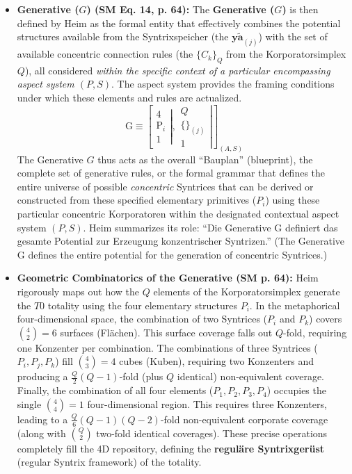 \documentclass[12pt]{article}
\newcommand{\q}[1]{\enquote{#1}}
\newcommand{\aspektivsystem}{P}
\newcommand{\subjektiveraspekt}{S}
\newcommand{\elementarstruktur}{\bm{y\widetilde{a}}_{(j)}}
\newcommand{\generative}{G}
\begin{document}
\begin{itemize}
    \item \textbf{Generative (\( \generative \)) (SM Eq. 14, p. 64):}
    The \textbf{Generative (\( \generative \))} is then defined by Heim as the formal entity that effectively combines the potential structures available from the Syntrixspeicher (the \( \elementarstruktur \)) with the set of available concentric connection rules (the \( \{C_k\}_Q \) from the Korporatorsimplex \( Q \)), all considered \textit{within the specific context of a particular encompassing aspect system \((\aspektivsystem,\subjektiveraspekt)\)}. The aspect system provides the framing conditions under which these elements and rules are actualized.
    \begin{equation}
\mathrm{G} \equiv \left[ \left. \begin{matrix} 4 \\ \mathrm{P}_i \\ 1 \end{matrix} \right| , \left. \begin{matrix} Q \\ \{ \}_{(j)} \\ 1 \end{matrix} \right| \right]_{(A, S)}
\label{eq:original_generative}
\end{equation}
    The Generative \( \generative \) thus acts as the overall \q{Bauplan} (blueprint), the complete set of generative rules, or the formal grammar that defines the entire universe of possible \textit{concentric} Syntrices that can be derived or constructed from these specified elementary primitives (\( P_i \)) using these particular concentric Korporatoren within the designated contextual aspect system \((\aspektivsystem,\subjektiveraspekt)\). Heim summarizes its role: \q{Die Generative G definiert das gesamte Potential zur Erzeugung konzentrischer Syntrizen.} (The Generative G defines the entire potential for the generation of concentric Syntrices.)

    \item \textbf{Geometric Combinatorics of the Generative (SM p. 64):}
    Heim rigorously maps out how the \(Q\) elements of the Korporatorsimplex generate the \(T0\) totality using the four elementary structures \(P_i\). In the metaphorical four-dimensional space, the combination of two Syntrices (\(P_i\) and \(P_k\)) covers \(\binom{4}{2} = 6\) surfaces (Flächen). This surface coverage falls out \(Q\)-fold, requiring one Konzenter per combination. The combinations of three Syntrices (\(P_i, P_j, P_k\)) fill \(\binom{4}{3} = 4\) cubes (Kuben), requiring two Konzenters and producing a \(\frac{Q}{2}(Q-1)\)-fold (plus \(Q\) identical) non-equivalent coverage. Finally, the combination of all four elements (\(P_1, P_2, P_3, P_4\)) occupies the single \(\binom{4}{4} = 1\) four-dimensional region. This requires three Konzenters, leading to a \(\frac{Q}{6}(Q-1)(Q-2)\)-fold non-equivalent corporate coverage (along with \(\binom{Q}{2}\) two-fold identical coverages). These precise operations completely fill the 4D repository, defining the \textbf{reguläre Syntrixgerüst} (regular Syntrix framework) of the totality.


\end{itemize}
\end{document}
